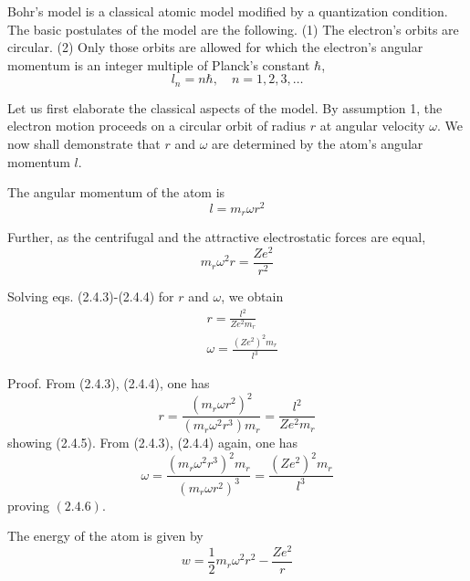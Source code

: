 \documentclass{article}
\begin{document}
Bohr's model is a classical atomic model modified by a quantization condition. The basic postulates of the model are the following.
(1) The electron's orbits are circular.
(2) Only those orbits are allowed for which the electron's angular momentum is an integer multiple of Planck's constant $\hbar$,
$$
\begin{equation*}
l_{n}=n \hbar, \quad n=1,2,3, \ldots \tag{2.4.2}
\end{equation*}
$$

Let us first elaborate the classical aspects of the model. By assumption 1, the electron motion proceeds on a circular orbit of radius $r$ at angular velocity $\omega$. We now shall demonstrate that $r$ and $\omega$ are determined by the atom's angular momentum $l$.

The angular momentum of the atom is
$$
\begin{equation*}
l=m_{r} \omega r^{2} \tag{2.4.3}
\end{equation*}
$$

Further, as the centrifugal and the attractive electrostatic forces are equal,
$$
\begin{equation*}
m_{r} \omega^{2} r=\frac{Z e^{2}}{r^{2}} \tag{2.4.4}
\end{equation*}
$$

Solving eqs. (2.4.3)-(2.4.4) for $r$ and $\omega$, we obtain
$$
\begin{align*}
& r=\frac{l^{2}}{Z e^{2} m_{r}}  \tag{2.4.5}\\
& \omega=\frac{\left(Z e^{2}\right)^{2} m_{r}}{l^{3}} \tag{2.4.6}
\end{align*}
$$

Proof. From (2.4.3), (2.4.4), one has
$$
\begin{equation*}
r=\frac{\left(m_{r} \omega r^{2}\right)^{2}}{\left(m_{r} \omega^{2} r^{3}\right) m_{r}}=\frac{l^{2}}{Z e^{2} m_{r}} \tag{2.4.7}
\end{equation*}
$$
showing (2.4.5). From (2.4.3), (2.4.4) again, one has
$$
\begin{equation*}
\omega=\frac{\left(m_{r} \omega^{2} r^{3}\right)^{2} m_{r}}{\left(m_{r} \omega r^{2}\right)^{3}}=\frac{\left(Z e^{2}\right)^{2} m_{r}}{l^{3}} \tag{2.4.8}
\end{equation*}
$$
proving $(2.4 .6)$.

The energy of the atom is given by
$$
\begin{equation*}
w=\frac{1}{2} m_{r} \omega^{2} r^{2}-\frac{Z e^{2}}{r} \tag{2.4.9}
\end{equation*}
$$
\end{document}
